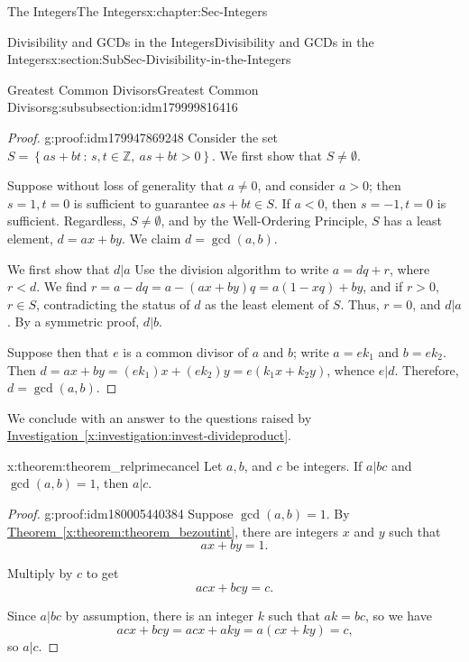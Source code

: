 \documentclass[oneside,10pt,]{book}
\newcommand{\xreffont}{\relax}
\numberwithin{equation}{section}
\newcommand{\setof}[2]{{\left\{#1\,\colon\,#2\right\}}}
\def\Z{{\mathbb Z}}
\newcommand{\lt}{<}
\newcommand{\gt}{>}
\begin{document}
\begin{chapterptx}{The Integers}{}{The Integers}{}{}{x:chapter:Sec-Integers}
\begin{sectionptx}{Divisibility and GCDs in the Integers}{}{Divisibility and GCDs in the Integers}{}{}{x:section:SubSec-Divisibility-in-the-Integers}
\begin{subsubsectionptx}{Greatest Common Divisors}{}{Greatest Common Divisors}{}{}{g:subsubsection:idm179999816416}
\begin{proof}{}{g:proof:idm179947869248}
Consider the set \(S = \setof{as+bt}{s,t\in\Z, \ as+bt \gt 0}\). We first show that \(S\ne \emptyset\).%
\par
Suppose without loss of generality that \(a\ne 0\), and consider \(a \gt 0\); then \(s=1, t = 0\) is sufficient to guarantee \(as+bt\in S\). If \(a \lt 0\), then \(s = -1, t= 0\) is sufficient. Regardless, \(S\ne \emptyset\), and by the Well-Ordering Principle, \(S\) has a least element, \(d = ax+by\). We claim \(d = \gcd(a,b)\).%
\par
We first show that \(d|a\) Use the division algorithm to write \(a = dq + r\), where \(r \lt d\). We find \(r = a - dq = a - (ax+by)q = a(1-xq) + by\), and if \(r\gt 0\), \(r\in S\), contradicting the status of \(d\) as the least element of \(S\). Thus, \(r = 0\), and \(d|a\). By a symmetric proof, \(d|b\).%
\par
Suppose then that \(e\) is a common divisor of \(a\) and \(b\); write \(a = e k_1\) and \(b = e k_2\). Then \(d = ax + by = (ek_1)x + (ek_2)y = e(k_1x + k_2 y)\), whence \(e|d\). Therefore, \(d = \gcd(a,b)\).%
\end{proof}
We conclude with an answer to the questions raised by \hyperref[x:investigation:invest-divideproduct]{Investigation~{\xreffont\ref{x:investigation:invest-divideproduct}}}.%
\begin{theorem}{}{}{x:theorem:theorem_relprimecancel}%
Let \(a, b\), and \(c\) be integers. If \(a|bc\) and \(\gcd(a,b) = 1\), then \(a|c\).%
\end{theorem}
\begin{proof}{}{g:proof:idm180005440384}
Suppose \(\gcd(a,b) = 1\). By \hyperref[x:theorem:theorem_bezoutint]{Theorem~{\xreffont\ref{x:theorem:theorem_bezoutint}}}, there are integers \(x\) and \(y\) such that%
\begin{equation*}
ax+by = 1\text{.}
\end{equation*}
%
\par
Multiply by \(c\) to get%
\begin{equation*}
acx + bcy = c\text{.}
\end{equation*}
%
\par
Since \(a|bc\) by assumption, there is an integer \(k\) such that \(ak = bc\), so we have%
\begin{equation*}
acx + bcy = acx + aky = a(cx+ky) = c\text{,}
\end{equation*}
so \(a|c\).%
\end{proof}
\end{subsubsectionptx}
\begin{conclusion}{}%

\end{conclusion}
\end{sectionptx}
\end{chapterptx}
\end{document}
